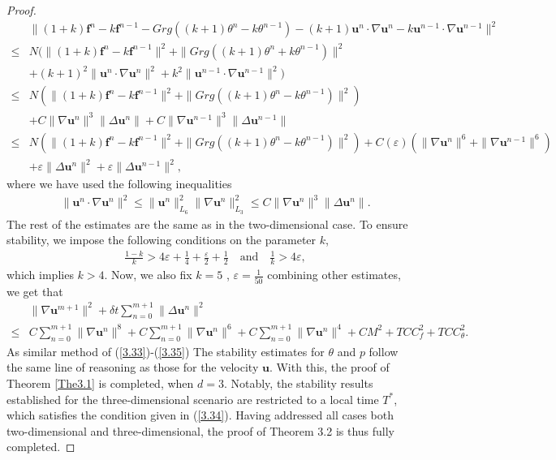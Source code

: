 \documentclass[10pt]{article}
\begin{document}
\begin{proof}
\begin{align}
			&\|(1+k)\bm{f}^n-k\bm{f}^{n-1}-Grg((k+1)\theta^n-k\theta^{n-1})-{ (k+1)\bm{u}^n\cdot\nabla\bm{u}^n-k\bm{u}^{n-1}\cdot\nabla\bm{u}^{n-1}}\|^2\nonumber\\
			\leq & N(\|(1+k)\bm{f}^n-k\bm{f}^{n-1}\|^2+\|Grg((k+1)\theta^n+k\theta^{n-1})\|^2\nonumber\\
			& +{ (k+1)^2\|\bm{u}^n\cdot\nabla\bm{u}^n\|^2+k^2\|\bm{u}^{n-1}\cdot\nabla\bm{u}^{n-1}\|^2})\nonumber\\
			\leq & N(\|(1+k)\bm{f}^n-k\bm{f}^{n-1}\|^2+\|Grg((k+1)\theta^n-k\theta^{n-1})\|^2)\nonumber\\
			&+C{ \|\nabla\bm{u}^n\|^3\|\Delta\bm{u}^n\|+C\|\nabla\bm{u}^{n-1}\|^3\|\Delta\bm{u}^{n-1}\|}\nonumber\\
			\leq & N(\|(1+k)\bm{f}^n-k\bm{f}^{n-1}\|^2+\|Grg((k+1)\theta^n-k\theta^{n-1})\|^2)  +C(\varepsilon)({ \|\nabla\bm{u}^n\|^6+\|\nabla\bm{u}^{n-1}\|^6})\nonumber\\
			&+\varepsilon\|\Delta\bm{u}^n\|^2+\varepsilon\|\Delta\bm{u}^{n-1}\|^2,
		\end{align}
		where we have used the following inequalities
		\begin{align}
			&\|\bm{u}^n\cdot\nabla\bm{u}^n\|^2\leq\|\bm{u}^n\|_{L_6}^2\|\nabla\bm{u}^n\|_{L_3}^2\leq C\|\nabla\bm{u}^n\|^3\|\Delta\bm{u}^n\|.
		\end{align}
		The rest of the estimates are the same as in the two-dimensional case.  To ensure stability, we impose the following conditions on the parameter \( k \),  
		\begin{align*}
			&\frac{1-k}{k}>4\varepsilon+\frac{1}{4}+\frac{\varepsilon}{2}+\frac{1}{2}  \quad\text{and} \quad \frac{1}{k}>4\varepsilon,
		\end{align*}
		which implies $k>4$. Now, we also fix $k=5$ , $\varepsilon=\frac{1}{50}$ combining other estimates, we get that
		{ \begin{align}
			&\|\nabla\bm{u}^{m+1}\|^2 + \delta t \sum_{n=0}^{m+1} \|\Delta\bm{u}^n\|^2 \label{eq:u-estimate} \nonumber\\
			\leq & C \sum_{n=0}^{m+1} \|\nabla\bm{u}^{n}\|^8 + C \sum_{n=0}^{m+1} \|\nabla\bm{u}^{n}\|^6 + C \sum_{n=0}^{m+1} \|\nabla\bm{u}^{n}\|^4 + C M^2 + T C C_f^2 + T C C_{\theta}^2.
		\end{align}}
	As similar method of (\ref{3.33})-(\ref{3.35})
		The stability estimates for \(\theta\) and $p$ follow the same line of reasoning as those for the velocity \(\bm{u}\). With this, the proof of Theorem \ref{The3.1} is completed, when $d=3$. Notably, the stability results established for the three-dimensional scenario are restricted to a local time \(T^*\), which satisfies the condition given in (\ref{3.34}). Having addressed all cases both two-dimensional and three-dimensional, the proof of Theorem 3.2 is thus fully completed.  
	\end{proof}
\end{document}
